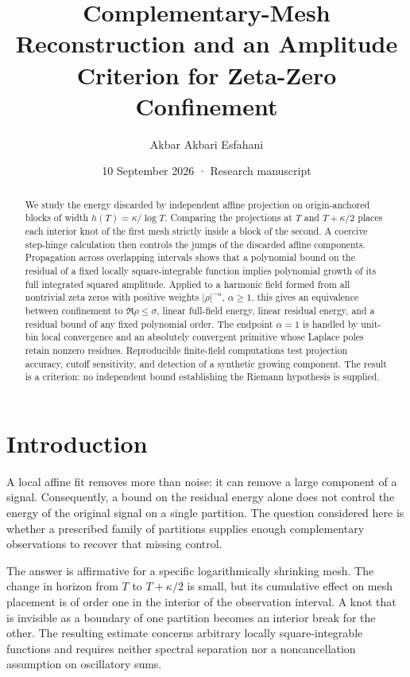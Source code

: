 \documentclass[
  11pt,
]{article}
\title{Complementary-Mesh Reconstruction and an Amplitude Criterion for
Zeta-Zero Confinement}
\author{Akbar Akbari Esfahani}
\date{10 September 2026 · Research manuscript}
\begin{document}
\maketitle
\begin{abstract}
We study the energy discarded by independent affine projection on
origin-anchored blocks of width \(h(T)=\kappa/\log T\). Comparing the
projections at \(T\) and \(T+\kappa/2\) places each interior knot of the
first mesh strictly inside a block of the second. A coercive step-hinge
calculation then controls the jumps of the discarded affine components.
Propagation across overlapping intervals shows that a polynomial bound
on the residual of a fixed locally square-integrable function implies
polynomial growth of its full integrated squared amplitude. Applied to a
harmonic field formed from all nontrivial zeta zeros with positive
weights \(|\rho|^{-\alpha}\), \(\alpha\ge1\), this gives an equivalence
between confinement to \(\Re\rho\le\sigma\), linear full-field energy,
linear residual energy, and a residual bound of any fixed polynomial
order. The endpoint \(\alpha=1\) is handled by unit-bin local
convergence and an absolutely convergent primitive whose Laplace poles
retain nonzero residues. Reproducible finite-field computations test
projection accuracy, cutoff sensitivity, and detection of a synthetic
growing component. The result is a criterion: no independent bound
establishing the Riemann hypothesis is supplied.
\end{abstract}

\hypertarget{introduction}{%
\section{Introduction}\label{introduction}}

A local affine fit removes more than noise: it can remove a large
component of a signal. Consequently, a bound on the residual energy
alone does not control the energy of the original signal on a single
partition. The question considered here is whether a prescribed family
of partitions supplies enough complementary observations to recover that
missing control.

The answer is affirmative for a specific logarithmically shrinking mesh.
The change in horizon from \(T\) to \(T+\kappa/2\) is small, but its
cumulative effect on mesh placement is of order one in the interior of
the observation interval. A knot that is invisible as a boundary of one
partition becomes an interior break for the other. The resulting
estimate concerns arbitrary locally square-integrable functions and
requires neither spectral separation nor a noncancellation assumption on
oscillatory sums.
\end{document}
